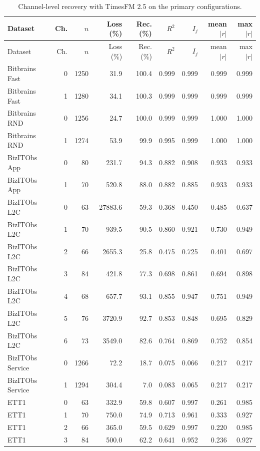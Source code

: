 \begin{longtable}{lrrrrrrrr}
\caption{Channel-level recovery with TimesFM 2.5 on the primary configurations.}\label{tab:s-channels}\\
\toprule
Dataset & Ch. & $n$ & Loss (\%) & Rec. (\%) & $R^2$ & $I_j$ & mean$|r|$ & max$|r|$ \\
\midrule
\endfirsthead
\toprule
Dataset & Ch. & $n$ & Loss (\%) & Rec. (\%) & $R^2$ & $I_j$ & mean$|r|$ & max$|r|$ \\
\midrule
\endhead
Bitbrains Fast & 0 & 1250 & 31.9 & 100.4 & 0.999 & 0.999 & 0.999 & 0.999 \\
Bitbrains Fast & 1 & 1280 & 34.1 & 100.3 & 0.999 & 0.999 & 0.999 & 0.999 \\
Bitbrains RND & 0 & 1256 & 24.7 & 100.0 & 0.999 & 0.999 & 1.000 & 1.000 \\
Bitbrains RND & 1 & 1274 & 53.9 & 99.9 & 0.995 & 0.999 & 1.000 & 1.000 \\
BizITObs App & 0 & 80 & 231.7 & 94.3 & 0.882 & 0.908 & 0.933 & 0.933 \\
BizITObs App & 1 & 70 & 520.8 & 88.0 & 0.882 & 0.885 & 0.933 & 0.933 \\
BizITObs L2C & 0 & 63 & 27883.6 & 59.3 & 0.368 & 0.450 & 0.485 & 0.637 \\
BizITObs L2C & 1 & 70 & 939.5 & 90.5 & 0.860 & 0.921 & 0.730 & 0.949 \\
BizITObs L2C & 2 & 66 & 2655.3 & 25.8 & 0.475 & 0.725 & 0.401 & 0.697 \\
BizITObs L2C & 3 & 84 & 421.8 & 77.3 & 0.698 & 0.861 & 0.694 & 0.898 \\
BizITObs L2C & 4 & 68 & 657.7 & 93.1 & 0.855 & 0.947 & 0.751 & 0.949 \\
BizITObs L2C & 5 & 76 & 3720.9 & 92.7 & 0.853 & 0.848 & 0.695 & 0.829 \\
BizITObs L2C & 6 & 73 & 3549.0 & 82.6 & 0.764 & 0.869 & 0.752 & 0.854 \\
BizITObs Service & 0 & 1266 & 72.2 & 18.7 & 0.075 & 0.066 & 0.217 & 0.217 \\
BizITObs Service & 1 & 1294 & 304.4 & 7.0 & 0.083 & 0.065 & 0.217 & 0.217 \\
ETT1 & 0 & 63 & 332.9 & 59.8 & 0.607 & 0.997 & 0.261 & 0.985 \\
ETT1 & 1 & 70 & 750.0 & 74.9 & 0.713 & 0.961 & 0.333 & 0.927 \\
ETT1 & 2 & 66 & 365.0 & 59.5 & 0.629 & 0.997 & 0.220 & 0.985 \\
ETT1 & 3 & 84 & 500.0 & 62.2 & 0.641 & 0.952 & 0.236 & 0.927 \\

\end{longtable}
